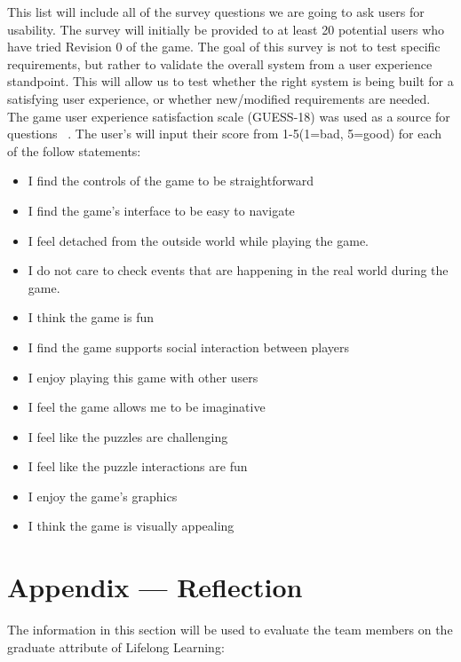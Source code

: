 \documentclass[12pt, titlepage]{article}
\begin{document}
This list will include all of the survey questions we are going to ask users for usability. The survey will initially be provided to at least 20 potential users who have tried Revision 0 of the game. The goal of this survey is not to test specific requirements, but rather to validate the overall system from a user experience standpoint. This will allow us to test whether the right system is being built for a satisfying user experience, or whether new/modified requirements are needed. The game user experience satisfaction scale (GUESS-18) was used as a source for questions ~\citep{GUESS-18}. The user's will input their score from 1-5(1=bad, 5=good) for each of the follow statements:
\begin{itemize}
    \item I find the controls of the game to be straightforward
    \item I find the game's interface to be easy to navigate
    \item I feel detached from the outside world while playing the game.
    \item I do not care to check events that are happening in the real world during the game.
    \item I think the game is fun
    \item I find the game supports social interaction between players
    \item I enjoy playing this game with other users
    \item I feel the game allows me to be imaginative
    \item I feel like the puzzles are challenging
    \item I feel like the puzzle interactions are fun
    \item I enjoy the game's graphics
    \item I think the game is visually appealing
\end{itemize}

\newpage{}
\section*{Appendix --- Reflection}


The information in this section will be used to evaluate the team members on the
graduate attribute of Lifelong Learning:
\end{document}

